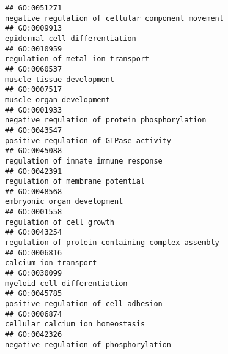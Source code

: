 \documentclass[
]{article}
\begin{document}
\begin{verbatim}
## GO:0051271                                                                                               negative regulation of cellular component movement
## GO:0009913                                                                                                                   epidermal cell differentiation
## GO:0010959                                                                                                                regulation of metal ion transport
## GO:0060537                                                                                                                        muscle tissue development
## GO:0007517                                                                                                                         muscle organ development
## GO:0001933                                                                                                   negative regulation of protein phosphorylation
## GO:0043547                                                                                                           positive regulation of GTPase activity
## GO:0045088                                                                                                             regulation of innate immune response
## GO:0042391                                                                                                                 regulation of membrane potential
## GO:0048568                                                                                                                      embryonic organ development
## GO:0001558                                                                                                                        regulation of cell growth
## GO:0043254                                                                                                regulation of protein-containing complex assembly
## GO:0006816                                                                                                                            calcium ion transport
## GO:0030099                                                                                                                     myeloid cell differentiation
## GO:0045785                                                                                                             positive regulation of cell adhesion
## GO:0006874                                                                                                                 cellular calcium ion homeostasis
## GO:0042326                                                                                                           negative regulation of phosphorylation

\end{verbatim}
\end{document}

